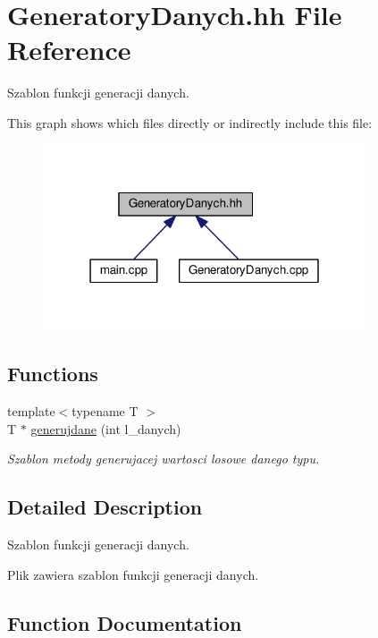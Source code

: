 \hypertarget{a00042}{}\section{Generatory\+Danych.\+hh File Reference}
\label{a00042}


Szablon funkcji generacji danych.  


This graph shows which files directly or indirectly include this file\+:
\nopagebreak
\begin{figure}[H]
\begin{center}
\leavevmode
\includegraphics[width=271pt]{a00093}
\end{center}
\end{figure}
\subsection*{Functions}
\begin{DoxyCompactItemize}
\item 
{\footnotesize template$<$typename T $>$ }\\T $\ast$ \hyperlink{a00042_a606abdfc67e509b613b56adf03ab6132}{generujdane} (int l\+\_\+danych)
\begin{DoxyCompactList}\small\item\em Szablon metody generujacej wartosci losowe danego typu. \end{DoxyCompactList}\end{DoxyCompactItemize}


\subsection{Detailed Description}
Szablon funkcji generacji danych. 

Plik zawiera szablon funkcji generacji danych. 

\subsection{Function Documentation}
\hypertarget{a00042_a606abdfc67e509b613b56adf03ab6132}{}
